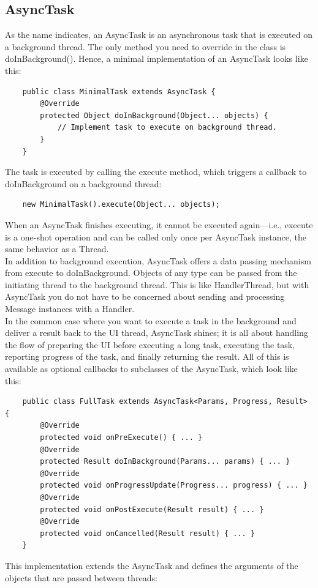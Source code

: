 \subsection{AsyncTask}
As the name indicates, an AsyncTask is an asynchronous task that is executed on a background thread. The only method you need to override in the class is doInBackground(). Hence, a minimal implementation of an AsyncTask looks like this:
\begin{lstlisting}
	public class MinimalTask extends AsyncTask {
		@Override
		protected Object doInBackground(Object... objects) {
			// Implement task to execute on background thread.
		}
	}
\end{lstlisting}
The task is executed by calling the execute method, which triggers a callback to doInBackground on a background thread:
\begin{lstlisting}
	new MinimalTask().execute(Object... objects);
\end{lstlisting}
When an AsyncTask finishes executing, it cannot be executed again—i.e., execute is a one-shot operation and can be called only once per AsyncTask instance, the same behavior as a Thread.\\
In addition to background execution, AsyncTask offers a data passing mechanism from execute to doInBackground. Objects of any type can be passed from the initiating thread to the background thread. This is like HandlerThread, but with AsyncTask you do not have to be concerned about sending and processing Message instances with a Handler.\\
In the common case where you want to execute a task in the background and deliver a result back to the UI thread, AsyncTask shines; it is all about handling the flow of preparing the UI before executing a long task, executing the task, reporting progress of the task, and finally returning the result. All of this is available as optional callbacks to subclasses of the AsyncTask, which look like this:
\begin{lstlisting}
	public class FullTask extends AsyncTask<Params, Progress, Result> {
		@Override
		protected void onPreExecute() { ... }
		@Override
		protected Result doInBackground(Params... params) { ... }
		@Override
		protected void onProgressUpdate(Progress... progress) { ... }
		@Override
		protected void onPostExecute(Result result) { ... }
		@Override
		protected void onCancelled(Result result) { ... }
	}
\end{lstlisting}
This implementation extends the AsyncTask and defines the arguments of the objects that are passed between threads:
